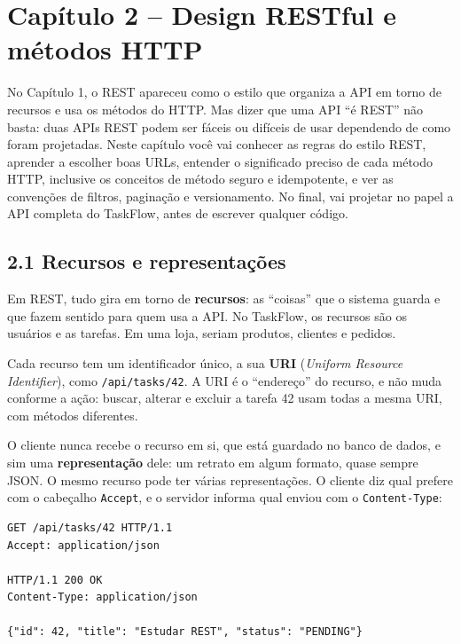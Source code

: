 \section{Capítulo 2 -- Design RESTful e métodos HTTP}

No Capítulo 1, o REST apareceu como o estilo que organiza a API em torno de recursos e usa os métodos do HTTP. Mas dizer que uma API ``é REST'' não basta: duas APIs REST podem ser fáceis ou difíceis de usar dependendo de como foram projetadas. Neste capítulo você vai conhecer as regras do estilo REST, aprender a escolher boas URLs, entender o significado preciso de cada método HTTP, inclusive os conceitos de método seguro e idempotente, e ver as convenções de filtros, paginação e versionamento. No final, vai projetar no papel a API completa do TaskFlow, antes de escrever qualquer código.

\subsection{2.1 Recursos e representações}

Em REST, tudo gira em torno de \textbf{recursos}: as ``coisas'' que o sistema guarda e que fazem sentido para quem usa a API. No TaskFlow, os recursos são os usuários e as tarefas. Em uma loja, seriam produtos, clientes e pedidos.

Cada recurso tem um identificador único, a sua \textbf{URI} (\textit{Uniform Resource Identifier}), como \texttt{/api/tasks/42}. A URI é o ``endereço'' do recurso, e não muda conforme a ação: buscar, alterar e excluir a tarefa 42 usam todas a mesma URI, com métodos diferentes.

O cliente nunca recebe o recurso em si, que está guardado no banco de dados, e sim uma \textbf{representação} dele: um retrato em algum formato, quase sempre JSON. O mesmo recurso pode ter várias representações. O cliente diz qual prefere com o cabeçalho \texttt{Accept}, e o servidor informa qual enviou com o \texttt{Content-Type}:

\begin{codigo}
\begin{Verbatim}[breaklines=true, breaksymbolleft={}, fontsize=\footnotesize]
GET /api/tasks/42 HTTP/1.1
Accept: application/json

HTTP/1.1 200 OK
Content-Type: application/json

{"id": 42, "title": "Estudar REST", "status": "PENDING"}
\end{Verbatim}
\end{codigo}

